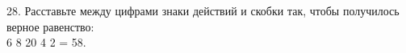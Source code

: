 28. Расставьте между цифрами знаки действий и скобки так, чтобы получилось верное равенство:\\ 6 8 20 4 2 = 58.\\
